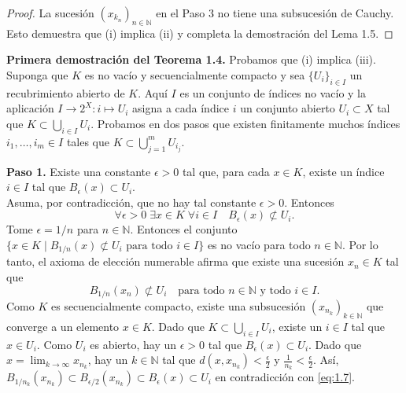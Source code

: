 \begin{proof}
La sucesión $(x_{k_{n}})_{n\in\mathbb{N}}$ en el Paso 3 no tiene una subsucesión de Cauchy. Esto demuestra que (i) implica (ii) y completa la demostración del Lema 1.5.
\end{proof}

\noindent \textbf{Primera demostración del Teorema 1.4.} Probamos que (i) implica (iii). Suponga que $K$ es no vacío y secuencialmente compacto y sea $\{U_{i}\}_{i\in I}$ un recubrimiento abierto de $K$. Aquí $I$ es un conjunto de índices no vacío y la aplicación $I\rightarrow 2^{X}:i\mapsto U_{i}$ asigna a cada índice $i$ un conjunto abierto $U_{i}\subset X$ tal que $K\subset\bigcup_{i\in I}U_{i}$. Probamos en dos pasos que existen finitamente muchos índices $i_{1},\dots,i_{m}\in I$ tales que $K\subset\bigcup_{j=1}^{m}U_{i_{j}}$.

\noindent \textbf{Paso 1.} Existe una constante $\epsilon>0$ tal que, para cada $x\in K$, existe un índice $i\in I$ tal que $B_{\epsilon}(x)\subset U_{i}$.
\\ Asuma, por contradicción, que no hay tal constante $\epsilon>0$. Entonces
\[ \forall\epsilon>0 \;\exists x\in K \;\forall i\in I \quad B_{\epsilon}(x)\not\subset U_{i}. \]
Tome $\epsilon=1/n$ para $n\in\mathbb{N}$. Entonces el conjunto $\{x\in K \mid B_{1/n}(x)\not\subset U_{i} \text{ para todo } i\in I\}$ es no vacío para todo $n\in\mathbb{N}$. Por lo tanto, el axioma de elección numerable afirma que existe una sucesión $x_{n}\in K$ tal que
\begin{equation}\label{eq:1.7}
B_{1/n}(x_{n})\not\subset U_{i} \quad \text{para todo } n\in\mathbb{N} \text{ y todo } i\in I.
\end{equation}
Como $K$ es secuencialmente compacto, existe una subsucesión $(x_{n_{k}})_{k\in\mathbb{N}}$ que converge a un elemento $x\in K$. Dado que $K\subset\bigcup_{i\in I}U_{i}$, existe un $i\in I$ tal que $x\in U_{i}$. Como $U_{i}$ es abierto, hay un $\epsilon>0$ tal que $B_{\epsilon}(x)\subset U_{i}$. Dado que $x=\lim_{k\rightarrow\infty}x_{n_{k}}$, hay un $k\in\mathbb{N}$ tal que $d(x,x_{n_{k}})<\frac{\epsilon}{2}$ y $\frac{1}{n_{k}}<\frac{\epsilon}{2}$. Así, $B_{1/n_{k}}(x_{n_{k}})\subset B_{\epsilon/2}(x_{n_{k}})\subset B_{\epsilon}(x)\subset U_{i}$ en contradicción con \eqref{eq:1.7}.

